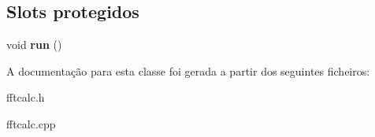 \subsection*{Slots protegidos}
\begin{DoxyCompactItemize}
\item 
\hypertarget{class_buffer_processor_a6faf10ab214287a399d05fce676dca6e}{void {\bfseries run} ()}\label{class_buffer_processor_a6faf10ab214287a399d05fce676dca6e}

\end{DoxyCompactItemize}


A documentação para esta classe foi gerada a partir dos seguintes ficheiros\-:\begin{DoxyCompactItemize}
\item 
fftcalc.\-h\item 
fftcalc.\-cpp\end{DoxyCompactItemize}
